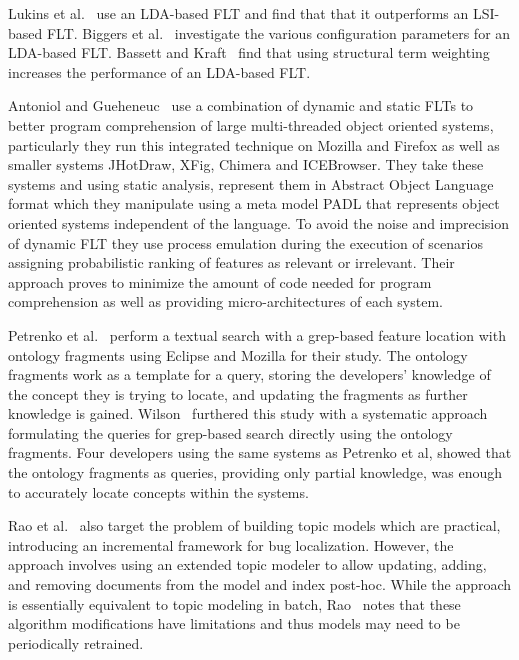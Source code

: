 Lukins et al.~\cite{Lukins-etal:2008} use an LDA-based FLT and
find that that it outperforms an LSI-based FLT.
Biggers et al.~\cite{Biggers-etal:2014} investigate the various configuration
parameters for an LDA-based FLT.
Bassett and Kraft~\cite{Bassett-Kraft:2013} find that using structural
term weighting increases the performance of an LDA-based FLT.

Antoniol and Gueheneuc~\cite{Antoniol-Gueheneuc:2005, Antoniol-Gueheneuc:2006} use a combination of dynamic and
static FLTs to better program comprehension of large multi-threaded
object oriented systems, particularly they run this integrated technique on
Mozilla and Firefox as well as smaller systems JHotDraw, XFig, Chimera and
ICEBrowser. They take these systems and using static analysis, represent them
in Abstract Object Language format which they manipulate using a meta model
PADL that represents object oriented systems independent of the language. To
avoid the noise and imprecision of dynamic FLT they use process emulation
during the execution of scenarios assigning probabilistic ranking of features as
relevant or irrelevant. Their approach proves to minimize the amount of code
needed for program comprehension as well as providing micro-architectures of
each system.

Petrenko et al.~\cite{Petrenko-etal:2008} perform a textual search with a grep-based
feature location with ontology fragments using Eclipse and Mozilla for their
study. The ontology fragments work as a template for a query, storing the
developers' knowledge of the concept they is trying to locate, and updating the
fragments as further knowledge is gained. Wilson~\cite{Wilson:2010} furthered this
study with a systematic approach formulating the queries for grep-based search
directly using the ontology fragments. Four developers using the same systems
as Petrenko et al, showed that the ontology fragments as queries, providing
only partial knowledge, was enough to accurately locate concepts within the
systems.

Rao et al.~\cite{Rao-etal:2013} also target the problem of building
topic models which are practical, introducing an incremental framework for bug localization.
However, the approach involves using an extended topic modeler to allow
updating, adding, and removing documents from the model and index post-hoc.
While the approach is essentially equivalent to topic modeling in batch,
Rao~\cite{Rao:2013} notes that these algorithm modifications have limitations and
thus models may need to be periodically retrained.
